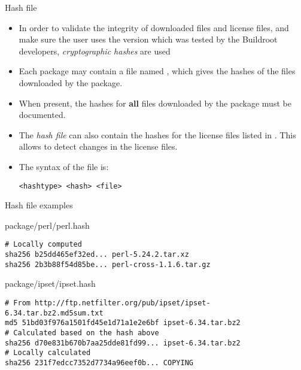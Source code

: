 \begin{frame}[fragile]{Hash file}

  \begin{itemize}

  \item In order to validate the integrity of downloaded files and
    license files, and make sure the user uses the version which was
    tested by the Buildroot developers, {\em cryptographic hashes} are
    used

  \item Each package may contain a file named ,
    which gives the hashes of the files downloaded by the package.

  \item When present, the hashes for {\bf all} files downloaded by the
    package must be documented.

  \item The {\em hash file} can also contain the hashes for the
    license files listed in . This allows to
    detect changes in the license files.

  \item The syntax of the file is:
    \begin{block}{}
      {\tiny
\begin{verbatim}
<hashtype> <hash> <file>
\end{verbatim}
      }
    \end{block}
  \end{itemize}
\end{frame}

\begin{frame}[fragile]{Hash file examples}
  \begin{block}{package/perl/perl.hash}
    {\tiny
\begin{verbatim}
# Locally computed
sha256 b25dd465ef32ed... perl-5.24.2.tar.xz
sha256 2b3b88f54d85be... perl-cross-1.1.6.tar.gz
\end{verbatim}
    }
  \end{block}

  \begin{block}{package/ipset/ipset.hash}
    {\tiny
\begin{verbatim}
# From http://ftp.netfilter.org/pub/ipset/ipset-6.34.tar.bz2.md5sum.txt
md5 51bd03f976a1501fd45e1d71a1e2e6bf ipset-6.34.tar.bz2
# Calculated based on the hash above
sha256 d70e831b670b7aa25dde81fd99... ipset-6.34.tar.bz2
# Locally calculated
sha256 231f7edcc7352d7734a96eef0b... COPYING
\end{verbatim}
    }
  \end{block}
\end{frame}

